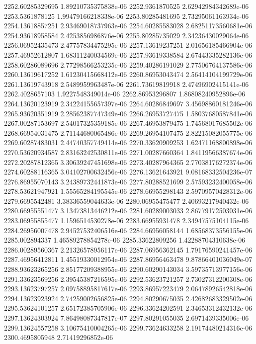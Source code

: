{2252.60285329695 1.89210735375838e-06
2252.9361870525 2.62942984342689e-06
2253.5361878125 1.99479166218338e-06
2253.80285481695 2.73295061163934e-06
2254.13618857251 2.93469018737963e-06
2254.60285583028 2.68251173560681e-06
2254.93618958584 2.4253856986876e-06
2255.80285735029 2.34236430029064e-06
2256.06952435473 2.47757834475295e-06
2257.13619237251 2.01656185466904e-06
2257.46952612807 1.68311240034569e-06
2257.93619338584 2.67443335282136e-06
2258.60286089696 2.77298566253235e-06
2259.40286191029 2.77506764137586e-06
2260.13619617252 1.61230415668412e-06
2260.86953043474 2.56414104199729e-06
2261.13619743918 2.5489959963487e-06
2261.73619819918 2.47496902415141e-06
2262.4028657103 1.9227548349014e-06
2262.86953296807 1.86808240952896e-06
2264.13620123919 2.34224155657397e-06
2264.60286849697 3.45698860181246e-06
2265.93620351919 2.28562387747349e-06
2266.26953727475 1.58037680587841e-06
2267.00287153697 2.54017325359185e-06
2267.46953879475 1.74568017685502e-06
2268.66954031475 2.71144680065486e-06
2269.26954107475 2.82215082055775e-06
2269.60287483031 2.44740357749414e-06
2270.33620909253 1.62471168800898e-06
2270.53620934587 2.83163242530811e-06
2271.00287660364 1.84119566387674e-06
2272.20287812365 3.30639247451698e-06
2273.40287964365 2.77038176272374e-06
2274.60288116365 3.04102700632456e-06
2276.13621643921 9.08168332504236e-07
2276.86955070143 3.24389732441873e-06
2277.80288521699 2.57593232400058e-06
2278.53621947921 1.55565284195545e-06
2278.66955298143 2.59709570428312e-06
2279.6695542481 3.38336559044633e-06
2280.06955475477 2.40693217940432e-06
2280.66955551477 3.13473813446212e-06
2281.60289003033 2.86779172503031e-06
2283.06955855477 1.1596514530278e-06
2283.66955931478 2.34947575104115e-06
2284.26956007478 2.94527532406516e-06
2284.66956058144 1.68568373556155e-06
2285.002894337 1.46589278854278e-06
2285.33622809256 1.42288704310638e-06
2286.00289560367 2.21326578956117e-06
2287.06956362145 1.79176590241457e-06
2287.46956412811 1.45519330012954e-06
2287.86956463478 9.87866401036049e-07
2288.93623265256 2.85177209388955e-06
2290.60290143034 3.59735713977156e-06
2291.33623569256 2.39545387216595e-06
2292.53623721257 2.73027312200308e-06
2293.13623797257 2.09758895817617e-06
2293.86957223479 2.06478926542818e-06
2294.13623923924 2.74259002656825e-06
2294.80290675035 2.42682683329502e-06
2295.53624101257 2.65172385705906e-06
2296.33624202591 2.34653312432132e-06
2297.13624303924 7.86498087347817e-07
2297.80291055035 2.6971439335006e-06
2299.13624557258 3.10675410004265e-06
2299.73624633258 2.19174480214316e-06
2300.4695805948 2.71419296852e-06
}

